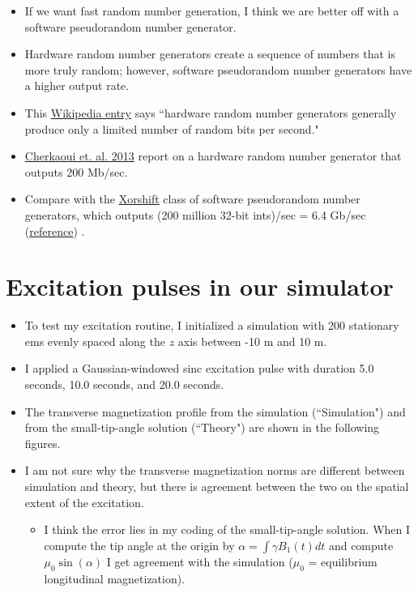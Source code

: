 \documentclass[dvipsnames]{beamer}
\begin{document}
\begin{frame}
\begin{itemize}
\item If we want fast random number generation, I think we are better off with a software pseudorandom number generator.
\item Hardware random number generators create a sequence of numbers that is more truly random; however, software pseudorandom number generators have a higher output rate.
\item This \href{https://en.wikipedia.org/wiki/Hardware_random_number_generator}{Wikipedia entry} says ``hardware random number generators generally produce only a limited number of random bits per second."
\item \href{https://www.iacr.org/archive/ches2013/80860154/80860154.pdf}{Cherkaoui et. al. 2013} report on a hardware random number generator that outputs 200 Mb/sec.
\item Compare with the \href{https://en.wikipedia.org/wiki/Xorshift}{Xorshift} class of software pseudorandom number generators, which outputs (200 million 32-bit ints)/sec = 6.4 Gb/sec (\href{https://scholar.google.ca/scholar?hl=en&as_sdt=0\%2C5&q=xorshift&btnG=}{reference}) .
\end{itemize}
\end{frame}

\section{Excitation pulses in our simulator}

\begin{frame}
\begin{itemize}
\item To test my excitation routine, I initialized a simulation with 200 stationary ems evenly spaced along the $z$ axis between -10 m and 10 m. 
\item I applied a Gaussian-windowed sinc excitation pulse with duration 5.0 seconds, 10.0 seconds, and 20.0 seconds.
\item The transverse magnetization profile from the simulation (``Simulation") and from the small-tip-angle solution (``Theory") are shown in the following figures.
\item I am not sure why the transverse magnetization norms are different between simulation and theory, but there is agreement between the two on the spatial extent of the excitation.
\begin{itemize}
\item I think the error lies in my coding of the small-tip-angle solution. When I compute the tip angle at the origin by $\alpha = \int \gamma B_1(t) dt$ and compute $\mu_0 \sin(\alpha)$ I get agreement with the simulation ($\mu_0$ = equilibrium longitudinal magnetization).
\end{itemize}
\end{itemize}
\end{frame}
\end{document}
